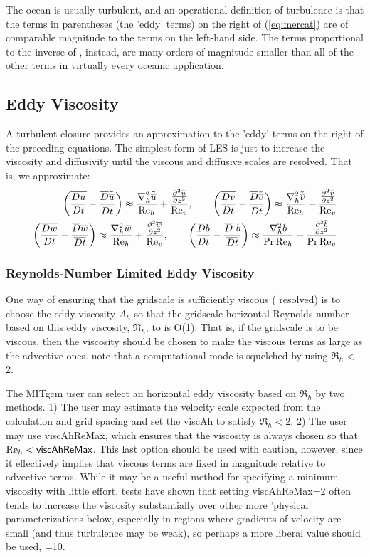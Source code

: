 The ocean is usually turbulent, and an operational definition of
turbulence is that the terms in parentheses (the 'eddy' terms) on the
right of (\ref{eq:mercat}) are of comparable magnitude to the terms on
the left-hand side.  The terms proportional to the inverse of \Re,
instead, are many orders of magnitude smaller than all of the other
terms in virtually every oceanic application.

\subsection{Eddy Viscosity} 
A turbulent closure provides an approximation to the 'eddy' terms on
the right of the preceding equations.  The simplest form of LES is
just to increase the viscosity and diffusivity until the viscous and
diffusive scales are resolved.  That is, we approximate:
\begin{eqnarray}
\left({\av{\Dt \tu}}-{\aDt \atu}\right)\approx\frac{\nabla^2_h{\atu}}{\Re_h}+\frac{\pds{z}{\atu}}{\Re_v}\label{eq:eddyvisc},\qquad
\left({\av{\Dt \tv}}-{\aDt \atv}\right)\approx\frac{\nabla^2_h{\atv}}{\Re_h}+\frac{\pds{z}{\atv}}{\Re_v}\nonumber\\
\left(\av{\Dt w}-\aDt {\av{w}}\right)\approx\frac{\nabla^2_h\av w}{\Re_h}+\frac{\pds{z}{\av w}}{\Re_v}\nonumber,\qquad
\left(\av{\Dt{b}}-\aDt{\ \av b} \right)\approx\frac{\nabla^2_h \av b}{\Pr\Re_h}+\frac{\pds{z} {\av b}}{\Pr\Re_v}\nonumber
\end{eqnarray}
   
\subsubsection{Reynolds-Number Limited Eddy Viscosity}   
One way of ensuring that the gridscale is sufficiently viscous (\ie
resolved) is to choose the eddy viscosity $A_h$ so that the gridscale
horizontal Reynolds number based on this eddy viscosity, $\Re_h$, to
is O(1).  That is, if the gridscale is to be viscous, then the
viscosity should be chosen to make the viscous terms as large as the
advective ones.  \citet{Bryanetal75} note that a computational mode is
squelched by using $\Re_h<$2.

The MITgcm user can select an horizontal eddy viscosity based on
$\Re_h$ by two methods.  1) The user may estimate the velocity scale
expected from the calculation and grid spacing and set the {\sf
  viscAh} to satisfy $\Re_h<2$.  2) The user may use {\sf
  viscAhReMax}, which ensures that the viscosity is always chosen so
that $\Re_h<{\sf viscAhReMax}$.  This last option should be used with
caution, however, since it effectively implies that viscous terms are
fixed in magnitude relative to advective terms.  While it may be a
useful method for specifying a minimum viscosity with little effort,
tests have shown that setting {\sf viscAhReMax}=2
\citep[per][]{Bryanetal75} often tends to increase the viscosity
substantially over other more 'physical' parameterizations below,
especially in regions where gradients of velocity are small (and thus
turbulence may be weak), so perhaps a more liberal value should be
used, =10.
  
